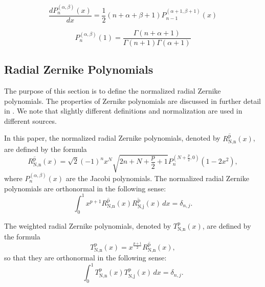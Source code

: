 \documentclass[12pt]{article}
\begin{document}
\begin{equation}\label{eq:jac3}
\frac{{d} P_n^{(\alpha ,\beta )}(x)}{{d} x}=\frac{1}{2} (n+\alpha +\beta +1)
   P_{n-1}^{(\alpha +1,\beta +1)}(x)
\end{equation}

\begin{equation}\label{eq:jac4}
  P_n^{(\alpha ,\beta )}(1) = \frac{\Gamma(n+\alpha+1)}{\Gamma(n+1)\Gamma(\alpha+1)}
\end{equation}

%
%
%
\subsection{Radial Zernike Polynomials}\label{sec:zernike}

The purpose of this section is to define the normalized radial Zernike polynomials.
The properties of Zernike polynomials are discussed in further detail in \cite{slepian1964prolate,serkh2015generalized}. 
We note that slightly different definitions and normalization are used in different sources. 

In this paper, the normalized radial Zernike polynomials, denoted by $\overline{R_{\text{N,n}}^{\text{p}}}(x)$, are defined by the formula
\begin{equation}\label{eq:def:norm_radial_zer}
\overline{R_{\text{N,n}}^{\text{p}}}(x)=\sqrt{2} (-1)^n x^N \sqrt{2 n+N+\frac{p}{2}+1}
   P_n^{\left(N+\frac{p}{2},0\right)}\left(1-2 x^2\right),
  \end{equation}
where $P_n^{(\alpha ,\beta )}(x)$ are the Jacobi polynomials. 
The normalized radial Zernike polynomials are orthonormal in the following sense: 
\begin{equation}
\int_0^1 x^{p+1} \overline{R_{\text{N,n}}^{\text{p}}}(x) \overline{R_{\text{N,j}}^{\text{p}}}(x) \, dx = \delta_{n,j} .
\end{equation}

The weighted radial Zernike polynomials, denoted by $T_{\text{N,n}}^{\text{p}}(x)$, are defined by the formula
\begin{equation}\label{eq:def:weighted_radial_zernike}
T_{\text{N,n}}^{\text{p}}(x)=x^{\frac{p+1}{2}} \overline{R_{\text{N,n}}^{\text{p}}}(x),
\end{equation}
so that they are orthonormal in the following sense:
\begin{equation}
\int_0^1  {T_{\text{N,n}}^{\text{p}}}(x) {T_{\text{N,j}}^{\text{p}}}(x) \, dx = \delta_{n,j} .
\end{equation}
\end{document}
